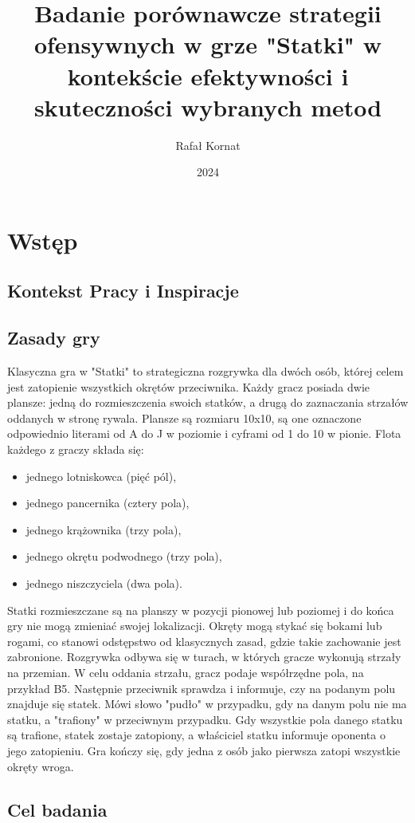 \documentclass[magisterska]{pracadypl}
\author{Rafał Kornat}
\title{Badanie porównawcze strategii ofensywnych w grze "Statki" w kontekście efektywności i skuteczności wybranych metod}
\date{2024}
\begin{document}
\maketitle
\tableofcontents
\newpage


\chapter{Wstęp}
\section{Kontekst Pracy i Inspiracje}
\section{Zasady gry}
Klasyczna gra w "Statki" to strategiczna rozgrywka dla dwóch osób, której 
celem jest zatopienie wszystkich okrętów przeciwnika. 
Każdy gracz posiada dwie plansze: jedną do rozmieszczenia swoich statków, a drugą do zaznaczania strzałów oddanych w stronę rywala. 
Plansze są rozmiaru 10x10, są one oznaczone odpowiednio literami od A do J w poziomie i cyframi od 1 do 10 w pionie.
Flota każdego z graczy składa się: 
\begin{itemize}
  \item jednego lotniskowca (pięć pól), 
  \item jednego pancernika (cztery pola), 
  \item jednego krążownika (trzy pola),
  \item jednego okrętu podwodnego (trzy pola),
  \item jednego niszczyciela (dwa pola).
\end{itemize}
Statki rozmieszczane są na planszy w pozycji pionowej lub poziomej i do końca gry nie mogą zmieniać swojej lokalizacji. 
Okręty mogą stykać się bokami lub rogami, co stanowi odstępstwo od klasycznych zasad, gdzie takie zachowanie jest zabronione.
Rozgrywka odbywa się w turach, w których gracze wykonują strzały na przemian.
W celu oddania strzału, gracz podaje współrzędne pola, na przykład B5. 
Następnie przeciwnik sprawdza i informuje, czy na podanym polu znajduje się statek.
Mówi słowo "pudło" w przypadku, gdy na danym polu nie ma statku, a "trafiony" w przeciwnym przypadku.
Gdy wszystkie pola danego statku są trafione, statek zostaje zatopiony, a właściciel statku informuje oponenta o jego zatopieniu.
Gra kończy się, gdy jedna z osób jako pierwsza zatopi wszystkie okręty wroga.
\section{Cel badania}
\end{document}
